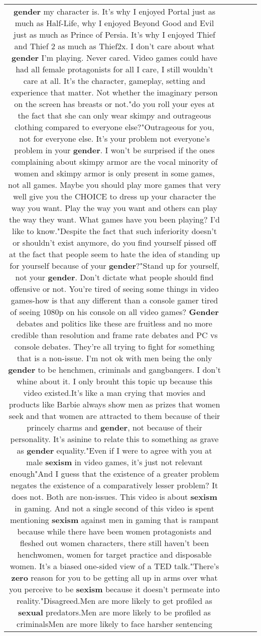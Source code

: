 \documentclass[11pt]{article}
\newlength\mylength
\begin{document}
\begin{center}
\begin{longtable}{|C{.65\mylength}|C{.30\mylength}|C{.12\mylength}|C{.12\mylength}|C{.12\mylength}|}
\textbf{gender} my character is. It's why I enjoyed Portal just as much as Half-Life, why I enjoyed Beyond Good and Evil just as much as Prince of Persia. It's why I enjoyed Thief and Thief 2 as much as Thief2x. I don't care about what \textbf{gender} I'm playing. Never cared. Video games could have had all female protagonists for all I care, I still wouldn't care at all. It's the character, gameplay, setting and experience that matter. Not whether the imaginary person on the screen has breasts or not."do you roll your eyes at the fact that she can only wear skimpy and outrageous clothing compared to everyone else?"Outrageous for you, not for everyone else. It's your problem not everyone's problem in your \textbf{gender}. I won't be surprised if the ones complaining about skimpy armor are the vocal minority of women and skimpy armor is only present in some games, not all games. Maybe you should play more games that very well give you the CHOICE to dress up your character the way you want. Play the way you want and others can play the way they want. What games have you been playing? I'd like to know."Despite the fact that such inferiority doesn't or shouldn't exist anymore, do you find yourself pissed off at the fact that people seem to hate the idea of standing up for yourself because of your \textbf{gender}?"Stand up for yourself, not your \textbf{gender}. Don't dictate what people should find offensive or not. You're tired of seeing some things in video games-how is that any different than a console gamer tired of seeing 1080p on his console on all video games? \textbf{Gender} debates and politics like these are fruitless and no more credible than resolution and frame rate debates and PC vs console debates. They're all trying to fight for something that is a non-issue. I'm not ok with men being the only \textbf{gender} to be henchmen, criminals and gangbangers. I don't whine about it. I only brouht this topic up because this video existed.It's like a man crying that movies and products like Barbie always show men as prizes that women seek and that women are attracted to them because of their princely charms and \textbf{gender}, not because of their personality. It's asinine to relate this to something as grave as \textbf{gender} equality."Even if I were to agree with you at male \textbf{sexism} in video games, it's just not relevant enough"And I guess that the existence of a greater problem negates the existence of a comparatively lesser problem? It does not. Both are non-issues. This video is about \textbf{sexism} in gaming. And not a single second of this video is spent mentioning \textbf{sexism} against men in gaming that is rampant because while there have been women protagonists and fleshed out women characters, there still haven't been henchwomen, women for target practice and disposable women. It's a biased one-sided view of a TED talk."There's \textbf{zero} reason for you to be getting all up in arms over what you perceive to be \textbf{sexism} because it doesn't permeate into reality."Disagreed.Men are more likely to get profiled as \textbf{sexual} predators.Men are more likely to be profiled as criminalsMen are more likely to face harsher sentencing 
\end{longtable}
\end{center}
\end{document}
